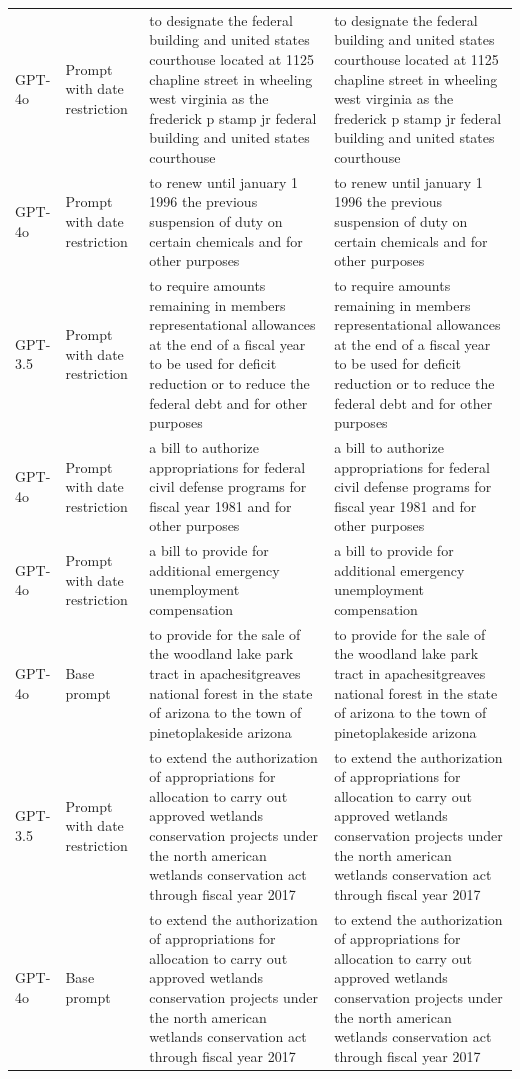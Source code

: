 \begin{longtable}{>{\raggedright\arraybackslash}p{1.4cm}>{\raggedright\arraybackslash}p{1.4cm}>{\raggedright\arraybackslash}p{5.5cm}>{\raggedright\arraybackslash}p{5.5cm}}
GPT-4o & Prompt with date restriction & to designate the federal building and united states courthouse located at 1125 chapline street in wheeling west virginia as the frederick p stamp jr federal building and united states courthouse & to designate the federal building and united states courthouse located at 1125 chapline street in wheeling west virginia as the frederick p stamp jr federal building and united states courthouse\\
GPT-4o & Prompt with date restriction & to renew until january 1 1996 the previous suspension of duty on certain chemicals and for other purposes & to renew until january 1 1996 the previous suspension of duty on certain chemicals and for other purposes\\
GPT-3.5 & Prompt with date restriction & to require amounts remaining in members representational allowances at the end of a fiscal year to be used for deficit reduction or to reduce the federal debt and for other purposes & to require amounts remaining in members representational allowances at the end of a fiscal year to be used for deficit reduction or to reduce the federal debt and for other purposes\\
GPT-4o & Prompt with date restriction & a bill to authorize appropriations for federal civil defense programs for fiscal year 1981 and for other purposes & a bill to authorize appropriations for federal civil defense programs for fiscal year 1981 and for other purposes\\
GPT-4o & Prompt with date restriction & a bill to provide for additional emergency unemployment compensation & a bill to provide for additional emergency unemployment compensation\\
GPT-4o & Base prompt & to provide for the sale of the woodland lake park tract in apachesitgreaves national forest in the state of arizona to the town of pinetoplakeside arizona & to provide for the sale of the woodland lake park tract in apachesitgreaves national forest in the state of arizona to the town of pinetoplakeside arizona\\
GPT-3.5 & Prompt with date restriction & to extend the authorization of appropriations for allocation to carry out approved wetlands conservation projects under the north american wetlands conservation act through fiscal year 2017 & to extend the authorization of appropriations for allocation to carry out approved wetlands conservation projects under the north american wetlands conservation act through fiscal year 2017\\
GPT-4o & Base prompt & to extend the authorization of appropriations for allocation to carry out approved wetlands conservation projects under the north american wetlands conservation act through fiscal year 2017 & to extend the authorization of appropriations for allocation to carry out approved wetlands conservation projects under the north american wetlands conservation act through fiscal year 2017\\

\end{longtable}
